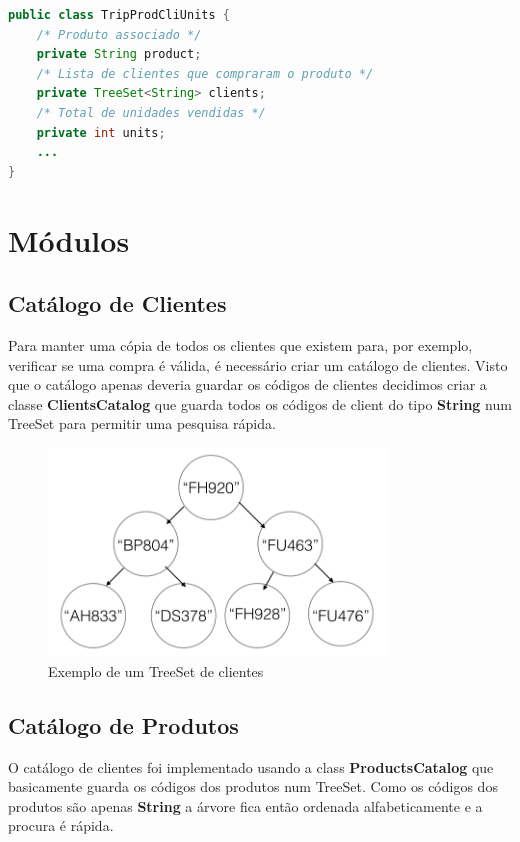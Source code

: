 \documentclass[10pt] {article}
\begin{document}
\begin{lstlisting}[language=Java]
public class TripProdCliUnits {
	/* Produto associado */
	private String product;
	/* Lista de clientes que compraram o produto */
	private TreeSet<String> clients;
	/* Total de unidades vendidas */
	private int units;
	...
}
\end{lstlisting}

\newpage
\section{Módulos}
\subsection{Catálogo de Clientes}
\par Para manter uma cópia de todos os clientes que existem para, por exemplo, verificar se uma compra é válida, é necessário 
criar um catálogo de clientes. Visto que o catálogo apenas deveria guardar os códigos de clientes decidimos criar a classe 
\textbf{ClientsCatalog} que guarda todos os códigos de client do tipo \textbf{String} num TreeSet para permitir uma pesquisa 
rápida.

\begin{figure}[ht!]
\centering
\includegraphics[width=90mm]{catclientes.png}
\caption{Exemplo de um TreeSet de clientes}
\end{figure}

\newpage
\subsection{Catálogo de Produtos}
\par O catálogo de clientes foi implementado usando a class  \textbf{ProductsCatalog} que basicamente guarda os códigos 
dos produtos num TreeSet. Como os códigos dos produtos são apenas \textbf{String} a árvore fica então ordenada 
alfabeticamente e a procura é rápida.
\end{document}
